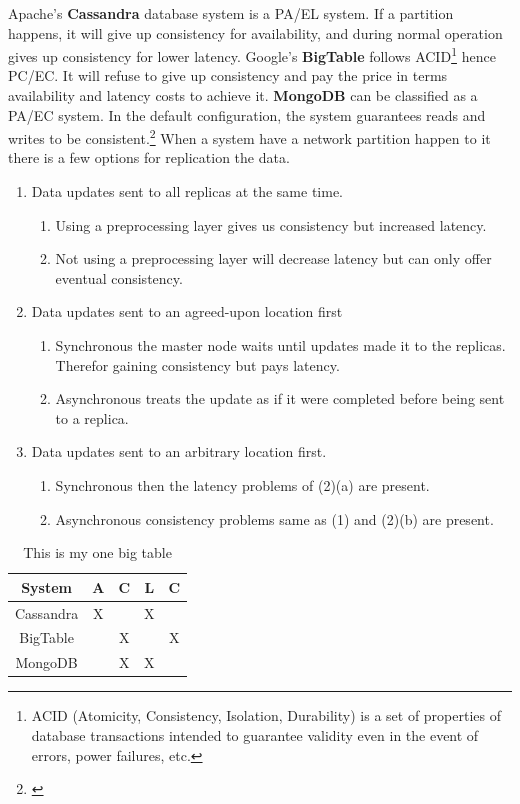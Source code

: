 \noindent Apache's \textbf{Cassandra} database system is a PA/EL system. If a partition happens, it will give up consistency for availability, and during normal operation gives up consistency for lower latency. Google's \textbf{BigTable}
follows ACID\footnote{ACID (Atomicity, Consistency, Isolation, Durability) is a set of properties of database transactions intended to guarantee validity even in the event of errors, power failures, etc.} hence PC/EC. It will refuse to give up consistency and pay the price in terms availability and latency costs to achieve it. \textbf{MongoDB} can be classified as a PA/EC system. In the default configuration, the system guarantees reads and writes to be consistent.\footnote{\cite[p.~42]{Abadi2012}}
When a system have a network partition happen to it there is a few options for replication the data.
\begin{enumerate}
	
	\item Data updates sent to all replicas at the same time.
	\begin{enumerate}
		\item Using a preprocessing layer gives us consistency but increased latency.
		\item Not using a preprocessing layer will decrease latency but can only offer eventual consistency.
	\end{enumerate}
	\item Data updates sent to an agreed-upon location first
	\begin{enumerate}
		\item Synchronous the master node waits until updates made it to the replicas. Therefor gaining consistency but pays latency.
		\item Asynchronous treats the update as if it were completed before being sent to a replica.
	\end{enumerate}
	\item Data updates sent to an arbitrary location first.
		\begin{enumerate}
		\item Synchronous then the latency problems of (2)(a) are present.
		\item Asynchronous consistency problems same as (1) and (2)(b) are present.
	\end{enumerate}
\end{enumerate}

\begin{table}[H]
	\centering
\begin{tabular}{|c|c|c|c|c|}
	\hline 
	System & A & C & L & C \\ 
	\hline 
	Cassandra & X &  & X &  \\ 
	\hline 
	BigTable &  & X &  & X \\ 
	\hline 
	MongoDB &  & X & X &  \\ 
	\hline 
\end{tabular}
  \caption{This is my one big table} \label{tab:PACELC}
\end{table}